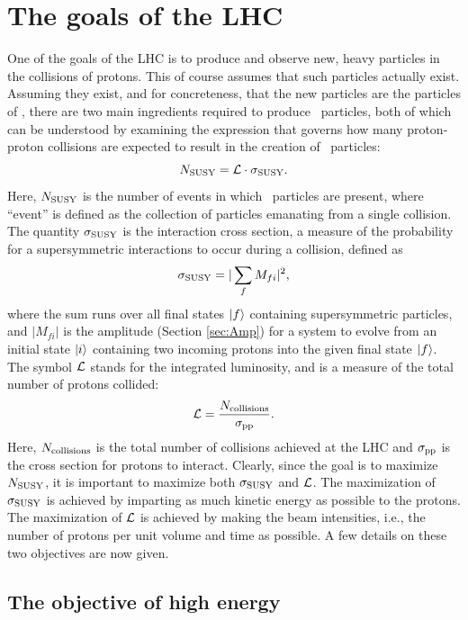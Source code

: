 \section{The goals of the LHC}
One of the goals of the LHC is to produce and observe new, heavy particles in the collisions of protons. This of course assumes that such particles actually exist. Assuming they exist, and for concreteness, that the new particles are the particles of \SUSY, there are two main ingredients required to produce \susy~particles, both of which can be understood by examining the expression that governs how many proton-proton collisions are expected to result in the creation of \susy~particles:
\begin{equation}
N_{\rm SUSY} = \mathcal{L}\cdot \sigma_{\rm SUSY}.
\end{equation}
Here, $N_{\rm SUSY}$ is the number of events in which \susy~particles are present, where ``event'' is defined as the collection of particles emanating from a single collision. The quantity $\sigma_{\rm SUSY}$ is the interaction cross section, a measure of the probability for a supersymmetric interactions to occur during a collision, defined as
\begin{equation}
\sigma_{\rm SUSY} = |\sum_{f}M_{fi}|^2,
\end{equation}
where the sum runs over all final states $\ket{f}$ containing supersymmetric particles, and $|M_{fi}|$ is the amplitude (Section \ref{sec:Amp}) for a system to evolve from an initial state $\ket{i}$ containing two incoming protons into the given final state $\ket{f}$. The symbol $\mathcal{L}$ stands for the integrated luminosity, and is a measure of the total number of protons collided:
\begin{equation}
\mathcal{L} = \frac{N_{\rm collisions}}{\sigma_{\rm pp}}.
\end{equation} 
Here, $N_{\rm collisions}$ is the total number of collisions achieved at the LHC and $\sigma_{\rm pp}$ is the cross section for protons to interact. Clearly, since the goal is to maximize $N_{\rm SUSY}$, it is important to maximize both $\sigma_{\rm SUSY}$ and $\mathcal{L}$. The maximization of $\sigma_{\rm SUSY}$ is achieved by imparting as much kinetic energy as possible to the protons.  The maximization of $\mathcal{L}$ is achieved by making the beam intensities, i.e., the number of protons per unit volume and time as possible. A few details on these two objectives are now given.

\subsection{The objective of high energy}

